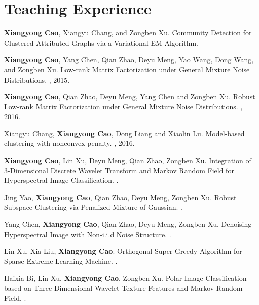 \documentclass[11pt,a4paper,sans]{moderncv}   %
\begin{document}
\section{Teaching Experience}

\begin{thebibliography}{1}
\textbf{Xiangyong Cao}, Xiangyu Chang, and Zongben Xu.
\newblock \textcolor[rgb]{0.00,0.00,1.00}{ Community Detection for Clustered Attributed Graphs via a Variational EM Algorithm.}

\textbf{Xiangyong Cao}, Yang Chen, Qian Zhao, Deyu Meng, Yao Wang, Dong Wang, and Zongben Xu.
\newblock \textcolor[rgb]{0.00,0.00,1.00}{Low-rank Matrix Factorization under General Mixture Noise Distributions.}
, 2015.

\textbf{Xiangyong Cao}, Qian Zhao, Deyu Meng, Yang Chen and Zongben Xu.
\newblock \textcolor[rgb]{0.00,0.00,1.00}{Robust Low-rank Matrix Factorization under General Mixture Noise Distributions.}
, 2016.

Xiangyu Chang, \textbf{Xiangyong Cao}, Dong Liang and Xiaolin Lu.
\newblock \textcolor[rgb]{0.00,0.00,1.00}{ Model-based clustering with nonconvex penalty.}
, 2016.

\textbf{Xiangyong Cao}, Lin Xu, Deyu Meng, Qian Zhao, Zongben Xu.
\newblock \textcolor[rgb]{0.00,0.00,1.00}{Integration of 3-Dimensional Discrete Wavelet Transform and Markov Random Field for Hyperspectral Image Classification.}
.

Jing Yao, \textbf{Xiangyong Cao}, Qian Zhao, Deyu Meng, Zongben Xu.
\newblock \textcolor[rgb]{0.00,0.00,1.00}{Robust Subspace Clustering via Penalized Mixture of Gaussian.}
.

Yang Chen, \textbf{Xiangyong Cao}, Qian Zhao, Deyu Meng,  Zongben Xu.
\newblock \textcolor[rgb]{0.00,0.00,1.00}{Denoising Hyperspectral Image with Non-i.i.d Noise Structure.}
.

Lin Xu, Xia Liu, \textbf{Xiangyong Cao}.
\newblock \textcolor[rgb]{0.00,0.00,1.00}{Orthogonal Super Greedy Algorithm for Sparse Extreme Learning Machine.}
.

Haixia Bi, Lin Xu, \textbf{Xiangyong Cao}, Zongben Xu.
\newblock \textcolor[rgb]{0.00,0.00,1.00}{Polar Image Classification based on Three-Dimensional Wavelet Texture Features and Markov Random Field.}
.

\end{thebibliography}
\end{document}
